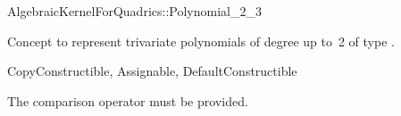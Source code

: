 \begin{ccRefConcept}{AlgebraicKernelForQuadrics::Polynomial_2_3}

\ccDefinition

Concept to represent
trivariate polynomials of degree up to~2 
of type .

\ccRefines
CopyConstructible, Assignable, DefaultConstructible

\ccCreation
{}

\ccOperations

The comparison operator \ccc{==} must be provided. 


\ccHasModels


\ccSeeAlso


\end{ccRefConcept}

